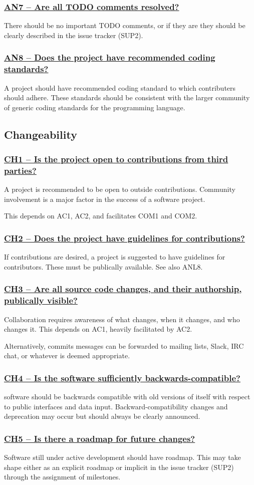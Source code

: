 \documentclass[a4paper,11pt]{article}
\newcommand{\criterion}[1]{\subsubsection*{\underline{#1}}}
\begin{document}
\criterion{AN7 -- Are all TODO comments resolved?}

There should be no important TODO comments, or if they are they should be
clearly described in the issue tracker (SUP2).

\criterion{AN8 -- Does the project have recommended coding standards?}

A project should have recommended coding standard to which contributers
should adhere. These standards should be consistent with the larger community
of generic coding standards for the programming language.

\subsection{Changeability}

\criterion{CH1 -- Is the project open to contributions from third parties?}

A project is recommended to be open to outside contributions. Community
involvement is a major factor in the success of a software project. 

This depends on AC1, AC2, and facilitates COM1 and COM2. 

\criterion{CH2 -- Does the project have guidelines for contributions?}

If contributions are desired, a project is suggested to have guidelines for
contributors. These must be publically available.
See also ANL8.

\criterion{CH3 -- Are all source code changes, and their authorship, publically visible?} 

Collaboration requires awareness of what changes, when it changes, and who
changes it. This depends on AC1, heavily facilitated by AC2.

Alternatively, commits messages can be forwarded to mailing lists, Slack, IRC chat, or
whatever is deemed appropriate.

\criterion{CH4 -- Is the software sufficiently backwards-compatible?}

software should be backwards compatible with old versions of itself with respect
to public interfaces and data input. Backward-compatibility changes and
deprecation may occur but should always be clearly announced.

\criterion{CH5 -- Is there a roadmap for future changes?}

Software still under active development should have roadmap. This may take
shape either as an explicit roadmap or implicit in the issue tracker
(SUP2) through the assignment of milestones.
\end{document}
